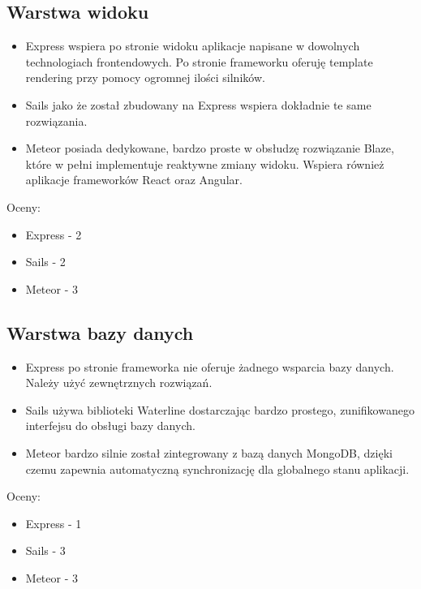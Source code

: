\documentclass[12pt]{report}
\begin{document}
    \subsection{Warstwa widoku}
      \begin{itemize}
        \item Express wspiera po stronie widoku aplikacje napisane w dowolnych technologiach frontendowych. Po stronie frameworku oferuję template rendering przy pomocy ogromnej ilości silników.
        \item Sails jako że został zbudowany na Express wspiera dokładnie te same rozwiązania.
        \item Meteor posiada dedykowane, bardzo proste w obsłudzę rozwiązanie Blaze, które w pełni implementuje reaktywne zmiany widoku. Wspiera również aplikacje frameworków React oraz Angular.
      \end{itemize}
      Oceny:
      \begin{itemize}
        \item Express - 2
        \item Sails - 2
        \item Meteor - 3
      \end{itemize}
      
    \subsection{Warstwa bazy danych}
      \begin{itemize}
        \item Express po stronie frameworka nie oferuje żadnego wsparcia bazy danych. Należy użyć zewnętrznych rozwiązań.
        \item Sails używa biblioteki Waterline dostarczając bardzo prostego, zunifikowanego interfejsu do obsługi bazy danych.
        \item Meteor bardzo silnie został zintegrowany z bazą danych MongoDB, dzięki czemu zapewnia automatyczną synchronizację dla globalnego stanu aplikacji.
      \end{itemize}
      Oceny:
      \begin{itemize}
        \item Express - 1
        \item Sails - 3
        \item Meteor - 3
      \end{itemize}
      
\end{document}

